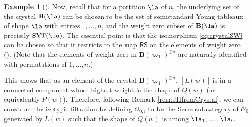 \documentclass[11pt,reqno]{amsart}
\numberwithin{equation}{section}
\theoremstyle{definition}
\newtheorem{eg}[equation]{Example}
\newenvironment{example}[1][]{\begin{eg}[#1] \pushQED{\qed}}{\popQED \end{eg}}
\theoremstyle{named}
\newcommand{\bB}{\mathbf{B}}
\newcommand{\cC}{\mathcal{C}}
\newcommand{\cO}{\mathcal{O}}
\DeclareMathOperator{\SYT}{SYT}
\begin{document}
\begin{example}
Now, recall that for a partition $\la$ of $n$, the underlying set of the crystal $\bB(\la)$ can be chosen to be the set of semistandard Young tableaux of shape $\la$ with entries $1,\hdots,n$, and the weight zero subset of $\bB(\la)$ is precisely $\SYT(\la)$.  
The essential point is that the isomorphism \eqref{eq:crystalSW} can be chosen so that it restricts to the map $\mathsf{RS}$ on the elements of weight zero (\cite[Theorem 3.5]{Shimozono}). (Note that  the elements of weight zero in $\bB(\varpi_1)^{\otimes n}$ are naturally identified with permutations of $1,\hdots,n$.)

This shows that as an element of the crystal $\bB(\varpi_1)^{\otimes n}$, $[L(w)]$ is in a connected component whose highest weight is the shape of $Q(w)$ (or equivalently $P(w)$).   
Therefore, following Remark \ref{rem:JHfromCrystal}, we can construct the isotypic filtration be defining  $\cO_{0,i}$ to be  the Serre subcategory of $\cO_0$ generated by $L(w)$ such that the shape of $Q(w)$ is among $\la_1,\hdots,\la_i$.



%
%
%
%
\end{example}
\end{document}
